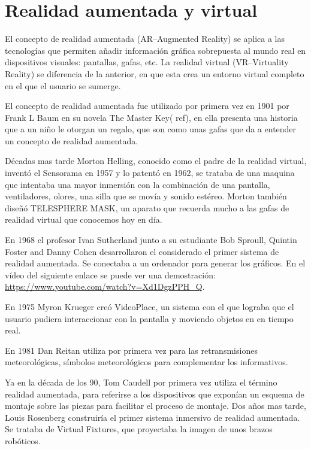 

\section{Realidad aumentada y virtual}

El concepto de realidad aumentada (AR--Augmented Reality) se aplica a las tecnologías que permiten añadir información gráfica sobrepuesta al mundo real en dispositivos visuales: pantallas, gafas, etc.
La realidad virtual (VR--Virtuality Reality) se diferencia de la anterior, en que esta crea un entorno virtual completo en el que el usuario se sumerge.
 


El concepto de realidad aumentada fue utilizado por primera vez en 1901 por Frank L Baum en su novela The Master Key( ref), en ella presenta una historia que a un niño le otorgan un regalo, que son como unas gafas que da a entender un concepto de realidad aumentada.

Décadas mas tarde Morton Helling, conocido como el padre de la realidad virtual, inventó el Sensorama en 1957 y lo patentó en 1962, se trataba de una maquina que intentaba una mayor inmersión con la combinación de una pantalla, ventiladores, olores, una silla que se movía y sonido estéreo. Morton también diseñó TELESPHERE MASK, un aparato que recuerda mucho a las gafas de realidad virtual que conocemos hoy en día.


En 1968 el profesor Ivan Sutherland junto a su estudiante Bob Sproull, Quintin Foster and Danny Cohen desarrollaron el considerado el primer sistema de realidad aumentada. Se conectaba a un ordenador para generar los gráficos. En el vídeo del siguiente enlace se puede ver una demostración: \url{https://www.youtube.com/watch?v=Xd1DgzPPH_Q}.


En 1975 Myron Krueger creó VideoPlace, un sistema con el que lograba que el usuario pudiera interaccionar con la pantalla y moviendo objetos en en tiempo real\cite{ARevolution}.



En 1981 Dan Reitan utiliza por primera vez para las retransmisiones meteorológicas, símbolos meteorológicos para complementar los informativos.

Ya en la década de los 90, Tom Caudell por primera vez utiliza el término realidad aumentada, para referirse a los dispositivos que exponían un esquema de montaje sobre las piezas para facilitar el proceso de montaje. 
Dos años mas tarde, Louis Rosenberg construiría el primer sistema inmersivo de realidad aumentada.  Se trataba de Virtual Fixtures, que proyectaba la imagen de unos brazos robóticos.

